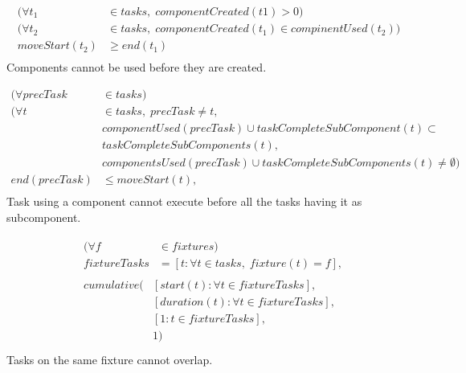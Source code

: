  \begin{equation}
 \begin{aligned}\label{eq:102}
 (\forall t_1 &\in tasks, \; componentCreated(t1) > 0) \\
 (\forall t_2 &\in tasks, \; componentCreated(t_1) \in compinentUsed(t_2)) \\
 moveStart(t_2) &\geq end(t_1) \\
 \end{aligned}
 \end{equation}
 Components cannot be used before they are created.
 
 \begin{equation}
 \begin{aligned}\label{eq:103}
 (\forall precTask &\in tasks) \\
 (\forall t &\in tasks, \; precTask \neq t,\\
 &componentUsed(precTask) \cup taskCompleteSubComponent(t) \subset\\
 &taskCompleteSubComponents(t),\\
 &componentsUsed(precTask) \cup taskCompleteSubComponents(t) \neq \emptyset)\\
 end(precTask) &\leq moveStart(t), \\
 \end{aligned}
 \end{equation}
 Task using a component cannot execute before all the tasks having it as subcomponent.
 
 \begin{equation}
 \begin{aligned}\label{eq:104}
 &\begin{aligned}
 (\forall f &\in fixtures) \\
 fixtureTasks &= [t : \forall t \in tasks, \; fixture(t) = f], 
 \end{aligned}\\
 &\begin{aligned}
 cumulative(&[start(t) : \forall t \in fixtureTasks],\\
 &[duration(t) : \forall t \in fixtureTasks],\\
 &[1 : t \in fixtureTasks],\\
 &1)
 \end{aligned}\\
 \end{aligned}
 \end{equation}
 Tasks on the same fixture cannot overlap.
 
